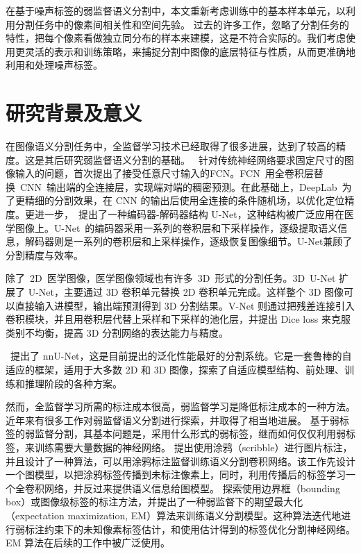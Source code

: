 在基于噪声标签的弱监督语义分割中，本文重新考虑训练中的基本样本单元，以利用分割任务中的像素间相关性和空间先验。
过去的许多工作，忽略了分割任务的特性，把每个像素看做独立同分布的样本来建模，这是不符合实际的。我们考虑使用更灵活的表示和训练策略，来捕捉分割中图像的底层特征与性质，从而更准确地利用和处理噪声标签。


\section{研究背景及意义}
在图像语义分割任务中，全监督学习技术已经取得了很多进展，达到了较高的精度。这是其后研究弱监督语义分割的基础。
\citet{long2015fully}~针对传统神经网络要求固定尺寸的图像输入的问题，首次提出了接受任意尺寸输入的FCN。FCN~用全卷积层替换~CNN~输出端的全连接层，实现端对端的稠密预测。在此基础上，DeepLab~为了更精细的分割效果，在 CNN 的输出后使用全连接的条件随机场，以优化定位精度。更进一步，\citet{ronneberger2015u}~提出了一种编码器-解码器结构 U-Net，这种结构被广泛应用在医学图像上。U-Net~的编码器采用一系列的卷积层和下采样操作，逐级提取语义信息，解码器则是一系列的卷积层和上采样操作，逐级恢复图像细节。U-Net兼顾了分割精度与效率。

除了~2D~医学图像，医学图像领域也有许多~3D~形式的分割任务。3D~U-Net 扩展了 U-Net，主要通过 3D 卷积单元替换 2D 卷积单元完成。这样整个 3D 图像可以直接输入进模型，输出端预测得到 3D 分割结果。V-Net 则通过把残差连接引入卷积模块，并且用卷积层代替上采样和下采样的池化层，并提出 Dice loss 来克服类别不均衡，提高 3D 分割网络的表达能力与精度。

\citet{isensee2019automated}~提出了 nnU-Net，这是目前提出的泛化性能最好的分割系统。它是一套鲁棒的自适应的框架，适用于大多数 2D 和 3D 图像，探索了自适应模型结构、前处理、训练和推理阶段的各种方案。

然而，全监督学习所需的标注成本很高，弱监督学习是降低标注成本的一种方法。近年来有很多工作对弱监督语义分割进行探索，并取得了相当地进展。
基于弱标签的弱监督分割，其基本问题是，采用什么形式的弱标签，继而如何仅仅利用弱标签，来训练需要大量数据的神经网络。
\citet{lin2016scribblesup} 提出使用涂鸦（scribble）进行图片标注，并且设计了一种算法，可以用涂鸦标注监督训练语义分割卷积网络。该工作先设计一个图模型，以把涂鸦标签传播到未标注像素上，同时，利用传播后的标签学习一个全卷积网络，并反过来提供语义信息给图模型。
\citet{papandreou2015weakly} 探索使用边界框（bounding box）或图像级标签的标注方法，并提出了一种弱监督下的期望最大化（expectation maximization, EM）算法来训练语义分割模型。这种算法迭代地进行弱标注约束下的未知像素标签估计，和使用估计得到的标签优化分割神经网络。EM 算法在后续的工作中被广泛使用。

